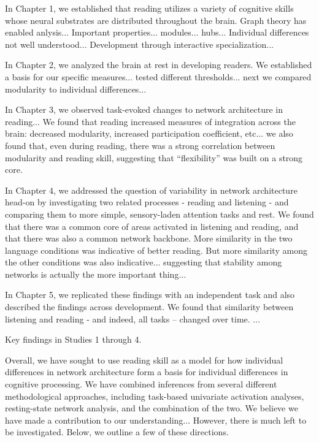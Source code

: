 In Chapter 1, we established that reading utilizes a variety of cognitive skills whose neural substrates are distributed throughout the brain. Graph theory has enabled anlysis...
Important properties... modules... hubs...
Individual differences not well understood...
Development through interactive specialization...

In Chapter 2, we analyzed the brain at rest in developing readers. We established a basis for our specific measures... tested different thresholds... next we compared modularity to individual differences...

In Chapter 3, we observed task-evoked changes to network architecture in reading... We found that reading increased measures of integration across the brain: decreased modularity, increased participation coefficient, etc... we also found that, even during reading, there was a strong correlation between modularity and reading skill, suggesting that ``flexibility'' was built on a strong core.

In Chapter 4, we addressed the question of variability in network architecture head-on by investigating two related processes - reading and listening - and comparing them to more simple, sensory-laden attention tasks and rest. We found that there was a common core of areas activated in listening and reading, and that there was also a common network backbone. More similarity in the two language conditions was indicative of better reading. But more similarity among the other conditions was also indicative... suggesting that stability among networks is actually the more important thing...

In Chapter 5, we replicated these findings with an independent task and also described the findings across development. We found that similarity between listening and reading - and indeed, all tasks -- changed over time. ...

\begin{table}[t]
	\renewcommand{\tabcolsep}{0.09cm}
	\centering
	
	\caption[Key findings.]{Key findings in Studies 1 through 4.}
	\label{table:ch6-key-findings}
\end{table}

Overall, we have sought to use reading skill as a model for how individual differences in network architecture form a basis for individual differences in cognitive processing. We have combined inferences from several different methodological approaches, including task-based univariate activation analyses, resting-state network analysis, and the combination of the two. We believe we have made a contribution to our understanding... However, there is much left to be investigated. Below, we outline a few of these directions.

